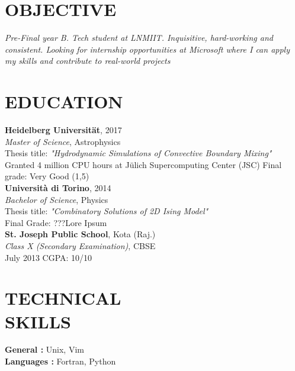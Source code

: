 \documentclass[margin]{res}
\begin{document}
\begin{resume}

\section{OBJECTIVE}
{\sl Pre-Final year B. Tech student at LNMIIT. Inquisitive, hard-working and consistent. Looking for internship opportunities at Microsoft where I can apply my skills and contribute to real-world projects }

\section{EDUCATION}
\textbf{Heidelberg Universität}, 2017\\
{\sl Master of Science}, Astrophysics\\
Thesis title: \textit{"Hydrodynamic Simulations of Convective Boundary Mixing"}\\
Granted 4 million CPU hours at Jülich Supercomputing Center (JSC)
\hfill Final grade: Very Good (1,5)\\

\textbf{Università di Torino}, 2014 \\
{\sl Bachelor of Science}, Physics\\
Thesis title: \textit{"Combinatory Solutions of 2D Ising Model"}\\
\hfill Final Grade: ???Lore Ipsum\\

\textbf{St. Joseph Public School}, Kota (Raj.) \\
{\sl Class X (Secondary Examination)}, CBSE\\
July 2013
\hfill CGPA: 10/10



\section{TECHNICAL\\SKILLS}

\textbf{General : } Unix, Vim
\\
\textbf{Languages : } Fortran, Python


\end{resume}
\end{document}
